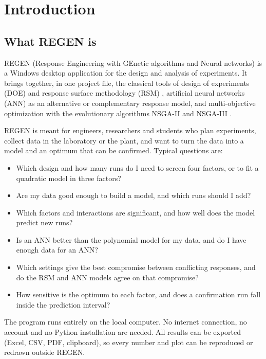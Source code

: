 \chapter{Introduction}\label{chap:1}
\label{ch:intro}

\section{What REGEN is}
\label{sec:ch01-what}

REGEN (Response Engineering with GEnetic algorithms and Neural networks) is a Windows desktop application for the
design and analysis of experiments. It brings together, in one project file, the classical tools of design of
experiments (DOE) and response surface methodology (RSM) \citep{montgomery2017,myers2016}, artificial neural
networks (ANN) as an alternative or complementary response model, and multi-objective optimization with the
evolutionary algorithms NSGA-II and NSGA-III \citep{deb2002,deb2014}.

REGEN is meant for engineers, researchers and students who plan experiments, collect data in the laboratory or the
plant, and want to turn the data into a model and an optimum that can be confirmed. Typical questions are:
\begin{itemize}
  \item Which design and how many runs do I need to screen four factors, or to fit a quadratic model in three
        factors?
  \item Are my data good enough to build a model, and which runs should I add?
  \item Which factors and interactions are significant, and how well does the model predict new runs?
  \item Is an ANN better than the polynomial model for my data, and do I have enough data for an ANN?
  \item Which settings give the best compromise between conflicting responses, and do the RSM and ANN models agree
        on that compromise?
  \item How sensitive is the optimum to each factor, and does a confirmation run fall inside the prediction
        interval?
\end{itemize}

The program runs entirely on the local computer. No internet connection, no account and no Python installation are
needed. All results can be exported (Excel, CSV, PDF, clipboard), so every number and plot can be reproduced or
redrawn outside REGEN.


